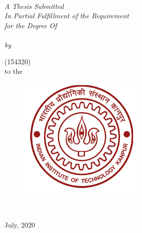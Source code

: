 \documentclass[11pt, a4paper, oneside]{Thesis} %
\begin{document}
\begin{titlepage}
\begin{center}

\HRule \\[0.4cm] %
{\huge \bfseries \ttitle}\\[0.4cm] %
\HRule \\[1.5cm] %
\large \textit{A Thesis Submitted\\ In Partial Fulfillment of the Requirement\\ for the Degree Of\\ \degreename}\\[0.3cm] %
\textit{by}\\[0.4cm]

\href{http://home.iitk.ac.in/~username}{\authornames}

(154320)\\ to the

\vfill
\graphicspath{ {./Pictures/} }
\begin{figure}[hb]
  \centering
  \includegraphics[width=0.4\linewidth]{redlogo.jpg}
\end{figure}

\textbf{\DEPTNAME}\\ %
\textsc{ \UNIVNAME}\\[1.5cm] %
\large {July, 2020}\\[2cm] %


\end{center}
\end{titlepage}
\end{document}
